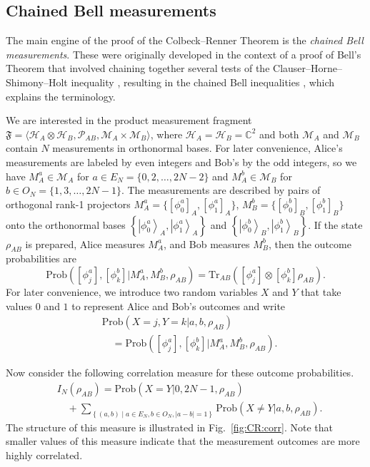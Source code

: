 \documentclass[DIV=calc,fontsize=12pt]{scrartcl} %
\theoremstyle{definition}
\theoremstyle{plain}
\newcommand{\Ket}[1]{\ensuremath{\left \vert #1 \right \rangle}}
\newcommand{\Proj}[1]{\ensuremath{\left [ #1 \right ]}}
\newcommand{\Hilb}[1][]{\ensuremath{\mathcal{H}_{#1}}}
\newcommand{\Tr}[2][]{\ensuremath{\text{Tr}_{#1} \left ( #2 \right )}}
\begin{document}
\subsection{Chained Bell measurements}

\label{CR:Chain}

The main engine of the proof of the Colbeck--Renner Theorem is the
\emph{chained Bell measurements}.  These were originally developed in
the context of a proof of Bell's Theorem that involved chaining
together several tests of the Clauser--Horne--Shimony--Holt inequality
\cite{Clauser1969}, resulting in the chained Bell inequalities
\cite{Braunstein1989, Braunstein1989a}, which explains the
terminology.

We are interested in the product measurement fragment $\mathfrak{F} =
\langle \Hilb[A] \otimes \Hilb[B], \mathcal{P}_{AB}, \mathcal{M}_A
\times \mathcal{M}_B \rangle$, where $\Hilb[A] = \Hilb[B] =
\mathbb{C}^2$ and both $\mathcal{M}_A$ and $\mathcal{M}_B$ contain $N$
measurements in orthonormal bases.  For later convenience, Alice's
measurements are labeled by even integers and Bob's by the odd
integers, so we have $M_A^a \in \mathcal{M}_A$ for $a \in E_N =
\{0,2,\ldots,2N-2\}$ and $M_A^b \in \mathcal{M}_B$ for $b \in O_N =
\{1,3,\ldots,2N-1\}$.  The measurements are described by pairs of
orthogonal rank-1 projectors $M_A^a =
\{\Proj{\phi^a_0}_A,\Proj{\phi^a_1}_A\}$, $M_B^b =
\{\Proj{\phi^b_0}_B,\Proj{\phi^b_1}_B\}$ onto the orthonormal bases
$\left \{ \Ket{\phi^a_0}_A, \Ket{\phi^a_1}_A \right \}$ and $\left \{
\Ket{\phi^b_0}_B, \Ket{\phi^b_1}_B \right \}$.  If the state
$\rho_{AB}$ is prepared, Alice measures $M_A^a$, and Bob measures
$M_B^b$, then the outcome probabilities are
\begin{equation}
\text{Prob} \left ( \Proj{\phi^a_j},
\Proj{\phi^b_k}|M_A^a,M_B^b,\rho_{AB}\right ) =
\Tr[AB]{\Proj{\phi^a_j} \otimes \Proj{\phi^b_k} \rho_{AB}}.
\end{equation}
For later convenience, we introduce two random variables $X$ and $Y$
that take values $0$ and $1$ to represent Alice and Bob's outcomes and
write
\begin{align}
&\text{Prob} (X = j,Y = k|a,b,\rho_{AB}) \nonumber\\
&\quad= \text{Prob} \left (
\Proj{\phi^a_j}, \Proj{\phi^b_k}|M_A^a,M_B^b,\rho_{AB}\right ).
\end{align}

Now consider the following correlation measure for these outcome
probabilities.
\begin{align}
\label{eq:CR:corr}
&I_N(\rho_{AB}) = \text{Prob}(X=Y|0,2N-1,\rho_{AB}) \nonumber\\
&\quad+ \sum_{\left
\{(a,b) \middle | a \in E_N, b \in O_N, |a-b| = 1 \right \}}
\text{Prob}(X \neq Y|a,b,\rho_{AB}).
\end{align}
The structure of this measure is illustrated in
Fig.~\ref{fig:CR:corr}. Note that smaller values of this measure
indicate that the measurement outcomes are more highly correlated.
\end{document}
